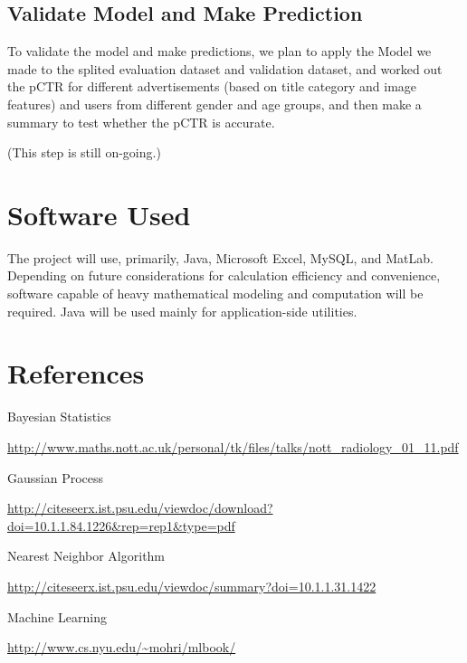 \documentclass{article} %
\begin{document}
\subsection{Validate Model and Make Prediction}
To validate the model and make predictions, we plan to apply the Model we made to the splited evaluation dataset and validation dataset, and worked out the pCTR for different advertisements (based on title category and image features) and users from different gender and age groups, and then make a summary to test whether the pCTR is accurate.

(This step is still on-going.)

\section{Software Used}
The project will use, primarily, Java, Microsoft Excel, MySQL, and MatLab. Depending on future considerations for calculation efficiency and convenience, software capable of heavy mathematical modeling and computation will be required. Java will be used mainly for application-side utilities.

\section{References}
Bayesian Statistics
 
\url{http://www.maths.nott.ac.uk/personal/tk/files/talks/nott_radiology_01_11.pdf}

Gaussian Process

\url{http://citeseerx.ist.psu.edu/viewdoc/download?doi=10.1.1.84.1226&rep=rep1&type=pdf}

Nearest Neighbor Algorithm

 \url{http://citeseerx.ist.psu.edu/viewdoc/summary?doi=10.1.1.31.1422}

Machine Learning

\url{http://www.cs.nyu.edu/~mohri/mlbook/}
\end{document}
